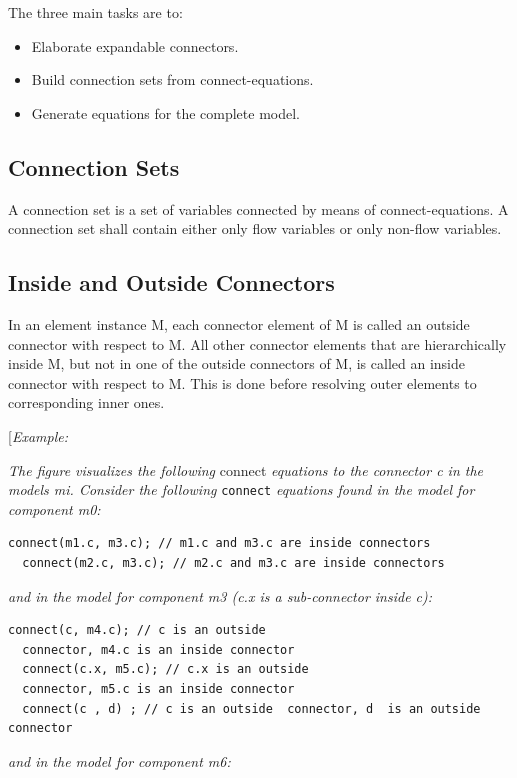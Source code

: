 \documentclass[10pt,a4paper]{report}
\def\doublelabel#1{\label{#1}\hypertarget{#1}{}}
\begin{document}
The three main tasks are to:

\begin{itemize}
\item
  Elaborate expandable connectors.
\item
  Build connection sets from connect-equations.
\item
  Generate equations for the complete model.
\end{itemize}

\subsection{Connection Sets}\doublelabel{connection-sets}

A connection set is a set of variables connected by means of
connect-equations. A connection set shall contain either only flow
variables or only non-flow variables.

\subsection{Inside and Outside Connectors}\doublelabel{inside-and-outside-connectors}

In an element instance M, each connector element of M is called an
outside connector with respect to M. All other connector elements that
are hierarchically inside M, but not in one of the outside connectors of
M, is called an inside connector with respect to M. This is done before
resolving outer elements to corresponding inner ones.

{[}\emph{Example:}

\emph{The figure visualizes the following} connect \emph{equations to
the connector c in the models m\textit{i}. Consider the
following} \lstinline!connect! \emph{equations found in the model for component m0:}

\begin{lstlisting}[language=modelica]
  connect(m1.c, m3.c); // m1.c and m3.c are inside connectors
  connect(m2.c, m3.c); // m2.c and m3.c are inside connectors
\end{lstlisting}
\emph{and in the model for component m3 (c.x is a sub-connector inside
c):}

\begin{lstlisting}[language=modelica]
  connect(c, m4.c); // c is an outside
  connector, m4.c is an inside connector
  connect(c.x, m5.c); // c.x is an outside
  connector, m5.c is an inside connector
  connect(c , d) ; // c is an outside  connector, d  is an outside connector
\end{lstlisting}
\emph{and in the model for component m6:}
\end{document}

